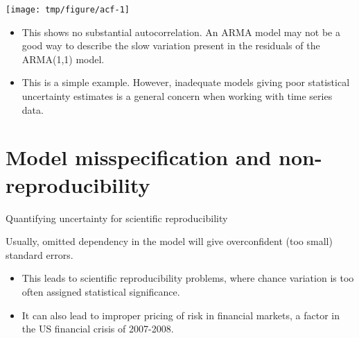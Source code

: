 \begin{frame}[fragile]

\begin{knitrout}\small
{}\color{fgcolor}\begin{kframe}
\begin{alltt}
\hlopt{$}
\end{alltt}
\end{kframe}
\end{knitrout}

\begin{knitrout}\small
{}\color{fgcolor}

{\centering \texttt{[image: tmp/figure/acf-1]} 

}


\end{knitrout}

\begin{itemize}
\item
This shows no substantial autocorrelation. An ARMA model may not be a good way to describe the slow variation present in the residuals of the ARMA(1,1) model. 
\item
This is a simple example. However, inadequate models giving poor statistical uncertainty estimates is a general concern when working with time series data.
\end{itemize}

\end{frame}

\section{Model misspecification and non-reproducibility}

\begin{frame}{Quantifying uncertainty for scientific reproducibility}

Usually, omitted dependency in the model will give overconfident (too small) standard errors. 

\begin{itemize}

\item This leads to scientific reproducibility problems, where chance variation is too often assigned statistical significance. 

\item It can also lead to improper pricing of risk in financial markets, a factor in the US financial crisis of 2007-2008.

\end{itemize}

\end{frame}


